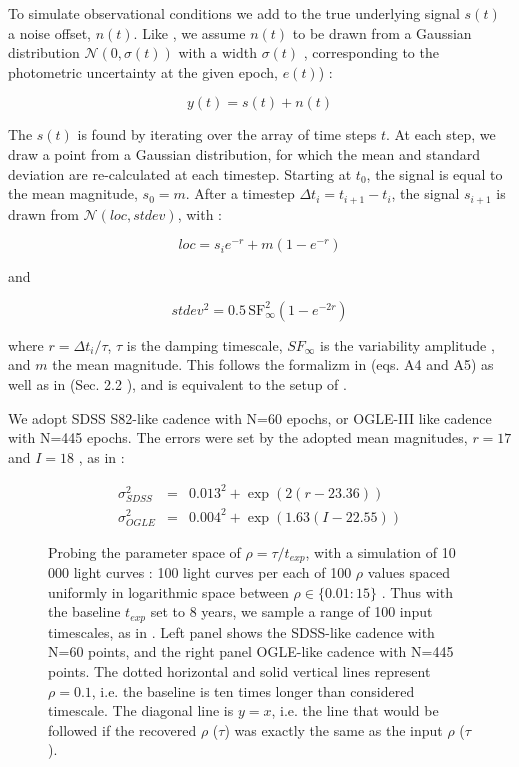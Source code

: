 \documentclass[twocolumn]{aastex62}
\begin{document}
To simulate observational conditions  we add to the true underlying signal  $s(t)$ a noise offset, $n(t)$.  Like \cite{kozlowski2017a},  we assume $n(t)$ to be drawn from a Gaussian distribution $\mathcal{N}(0,\sigma(t))$ with a width $\sigma(t)$ , corresponding to the  photometric uncertainty at the given epoch,  $e(t)$) : 

\begin{equation}
y(t) = s(t) + n(t) 
\end{equation}

The $s(t)$ is found by iterating over the array of time steps $t$.  At each step, we draw a point from a Gaussian distribution, for which the mean and standard deviation are re-calculated at each timestep. Starting at $t_{0}$, the signal is equal to the mean magnitude, $s_{0} = m$. After a timestep $\Delta t_{i} = t_{i+1} - t_{i}$, the signal $s_{i+1}$ is drawn from  $\mathcal{N}(loc, stdev)$, with : 

\begin{equation}
loc = s_{i} e ^ { - r  }  + m \left( 1 - e ^{ - r }\right)
\end{equation}

and 

\begin{equation}
stdev^{2} =  0.5  \, \mathrm{SF}_{\infty}^{2} \left( 1 - e ^{  - 2 r  }  \right)
\end{equation}

where  $r = \Delta t_{i} / \tau$, $\tau$ is the damping timescale,   $SF_{\infty}$ is the  variability amplitude , and $m$ the mean magnitude.  This follows the formalizm in \cite{kelly2009} (eqs. A4 and A5) as well as in \cite{macleod2010} (Sec. 2.2 ), and is equivalent to the setup of  \cite{kozlowski2017a}. 


We adopt SDSS S82-like cadence with N=60 epochs, or OGLE-III like cadence with N=445 epochs.  The errors were set by the adopted mean magnitudes, $r=17$ and $I=18$ , as in \cite{kozlowski2017a} :

\begin{eqnarray}
\sigma_{SDSS}^{2} &=& 0.013^{2} + \exp{(2 (r-23.36))} \\
\sigma_{OGLE}^{2} &=& 0.004^{2} + \exp{(1.63 (I - 22.55))}
\end{eqnarray}


\begin{figure*}
\caption{Probing the parameter space of $\rho = \tau / t_{exp}$, with a simulation of  10 000 light curves : 100 light curves per each of 100 $\rho$ values spaced uniformly in logarithmic space between $\rho \in   \{ 0.01 : 15\}$ . Thus with the baseline $t_{exp}$ set to 8 years,  we sample a range of 100 input timescales, as in \citet{kozlowski2017a}. Left panel shows the SDSS-like cadence with N=60 points, and the right panel OGLE-like cadence with N=445 points. The dotted horizontal and solid vertical lines represent $\rho = 0.1$, i.e. the baseline is ten times longer than considered timescale. The diagonal line is $y=x$, i.e. the line that would be followed if the recovered  $\rho$ ($\tau$) was exactly the same as  
the input $\rho$ ($\tau$).} 
\label{fig:Fig2kozlowski}
\end{figure*}
\end{document}
